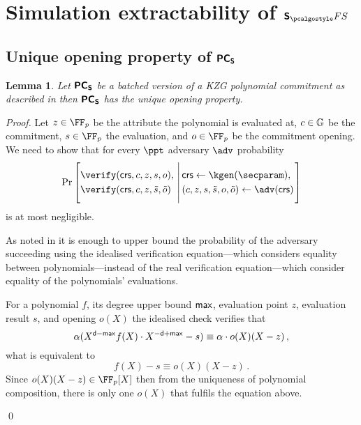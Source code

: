\let\accentvec\vec \documentclass[runningheads,10pt]{llncs}
\newtheorem{lemma}[theorem]{Lemma}
\begin{document}
\section{Simulation extractability of $\sonicprotfs$}
\subsection{Unique opening property of $\bm{\mathsf{PC}}_{\bm{\mathsf{S}}}$}
\begin{lemma}
\label{lem:pcoms_unique_op}
Let $\bm{\mathsf{PC}}_{\bm{\mathsf{S}}}$ be a batched version of a KZG polynomial commitment
\cite{AC:KatZavGol10} as described in \cite{CCS:MBKM19} then $\bm{\mathsf{PC}}_{\bm{\mathsf{S}}}$ has the unique opening property. 
\end{lemma}
\begin{proof}
Let 
$z \in \FF_p$ be the attribute the polynomial is evaluated at,
$c \in \mathbb{G}$ be the commitment,  
$s \in \FF_p$ the evaluation, and 
$o \in \FF_p$ be the commitment opening. 
We need to show that for every $\ppt$ adversary $\adv$ probability
\[
	\Pr
		\left[
			\begin{aligned}
				& \verify(\crs, c, z, s, o), \\
				& \verify(\crs, c, z, \tilde{s}, \tilde{o})
			\end{aligned}
		\,\left|\,
		\vphantom{\begin{aligned}
			& \verify(\crs, c, z, s, o),\\
			& \verify(\crs, c, z, \tilde{s}, \tilde{o}) \\
			&o \neq \tilde{o})
		\end{aligned}}
		\begin{aligned}
			& \crs \gets \kgen(\secparam), \\
			&	(c, z, s, \tilde{s}, o, \tilde{o}) \gets \adv(\crs)
		\end{aligned}
		\right.\right]
\]
is at most negligible.

As noted in \cite[Lemma 2.2]{EPRINT:GabWilCio19} it is enough to upper bound
the probability of the adversary succeeding using the idealised verification equation---which considers equality between polynomials---instead of the real verification equation---which consider equality of the polynomials' evaluations.

For a polynomial $f$, its degree upper bound $\mathsf{max}$, evaluation point $z$, evaluation result $s$, and opening $o(X)$ the idealised check verifies that
\begin{equation}
	\alpha (X^{\mathsf{d} - \mathsf{max}}f(X) \cdot X^{-\mathsf{d} + \mathsf{max}} -  s) \equiv \alpha \cdot o(X) (X - z)\,,
\end{equation}
what is equivalent to 
\begin{equation}
	f(X) -  s \equiv o(X) (X - z)\,.
	\label{eq:pcoms_idealised_check}
\end{equation}
Since $o(X)(X - z) \in \FF_p[X]$ then from the uniqueness of polynomial composition, there is only one $o(X)$ that fulfils the equation above.

\qed
\end{proof}
\end{document}
